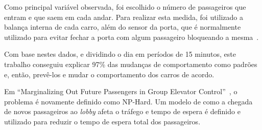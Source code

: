 Como principal variável observada, foi escolhido o número de passageiros que
entram e que saem em cada andar. Para realizar esta medida, foi utilizado a
balança interna de cada carro, além do sensor da porta, que é normalmente
utilizado para evitar fechar a porta com algum passageiro bloqueando a mesma~\cite{marja97}.

Com base nestes dados, e dividindo o dia em períodos de 15 minutos, este
trabalho conseguiu explicar 97\% das mudanças de comportamento como padrões e,
então, prevê-los e mudar o comportamento dos carros de acordo.

Em ``Marginalizing Out Future Passengers in Group Elevator
Control''~\cite{DBLP:journals/corr/abs-1212-2499}, o problema é novamente
definido como NP-Hard. Um modelo de como a chegada de novos passageiros ao
\textit{lobby} afeta o tráfego e tempo de espera é definido e utilizado para
reduzir o tempo de espera total dos passageiros.
